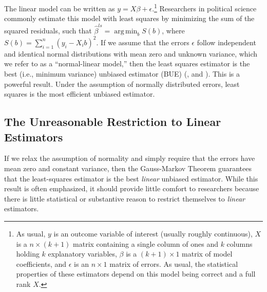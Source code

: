 \documentclass[12pt]{article}
\DeclareMathOperator*{\argmin}{arg\,min}
\begin{document}
The linear model can be written as $y = X\beta + \epsilon$.\footnote{As usual, $y$ is an outcome variable of interest (usually roughly continuous), $X$ is a $n \times (k + 1)$ matrix containing a single column of ones and $k$ columns holding $k$ explanatory variables, $\beta$ is a $(k + 1) \times 1$ matrix of model coefficients, and $\epsilon$ is an $n \times 1$ matrix of errors. As usual, the statistical properties of these estimators depend on this model being correct and a full rank $X$.} 
Researchers in political science commonly estimate this model with least squares by minimizing the sum of the squared residuals, such that $\hat{\beta}^{ls} = \argmin_b S(b)$, where $S(b) = \sum_{i = 1}^n(y_i - X_ib)^2$. 
If we assume that the errors $\epsilon$ follow independent and identical normal distributions with mean zero and unknown variance, which we refer to as a ``normal-linear model,'' then the least squares estimator is the best (i.e., minimum variance) unbiased estimator (BUE) (\citealt[pp. 334--342]{CasellaBerger2002}, and \citealt[807--815]{Wooldridge2013}).
This is a powerful result. 
Under the assumption of normally distributed errors, least squares is the most efficient unbiased estimator.

\subsection*{The Unreasonable Restriction to Linear Estimators}

If we relax the assumption of normality and simply require that the errors have mean zero and constant variance, then the Gauss-Markov Theorem guarantees that the least-squares estimator is the best \textit{linear} unbiased estimator. 
While this result is often emphasized, it should provide little comfort to researchers because there is little statistical or substantive reason to restrict themselves to \textit{linear} estimators.
\end{document}
